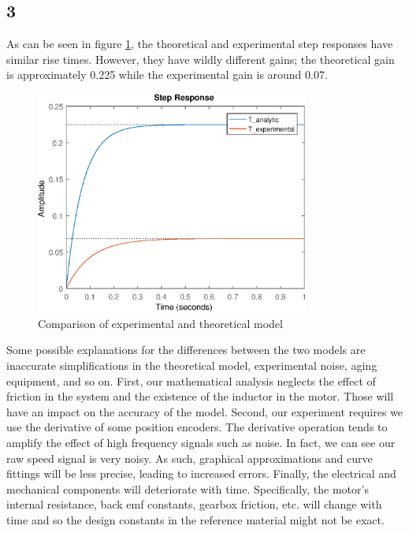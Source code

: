 \documentclass{article}
\begin{document}
\subsection*{3}

As can be seen in figure \ref{fig:com1}, the theoretical and experimental step responses have similar rise times. However, they have wildly different gains; the theoretical gain is approximately 0.225 while the experimental gain is around 0.07.

\begin{figure}[!htb]
    \centering
    \includegraphics[width=0.8\textwidth]{../Experiments/compare.eps}
    \caption{Comparison of experimental and theoretical model}
    \label{fig:com1}
\end{figure}

Some possible explanations for the differences between the two models are inaccurate simplifications in the theoretical model, experimental noise, aging equipment, and so on. First, our mathematical analysis neglects the effect of friction in the system and the existence of the inductor in the motor. Those will have an impact on the accuracy of the model. Second, our experiment requires we use the derivative of some position encoders. The derivative operation tends to amplify the effect of high frequency signals such as noise. In fact, we can see our raw speed signal is very noisy. As such, graphical approximations and curve fittings will be less precise, leading to increased errors. Finally, the electrical and mechanical components will deteriorate with time. Specifically, the motor's internal resistance, back emf constants, gearbox friction, etc. will change with time and so the design constants in the reference material might not be exact.
\end{document}
